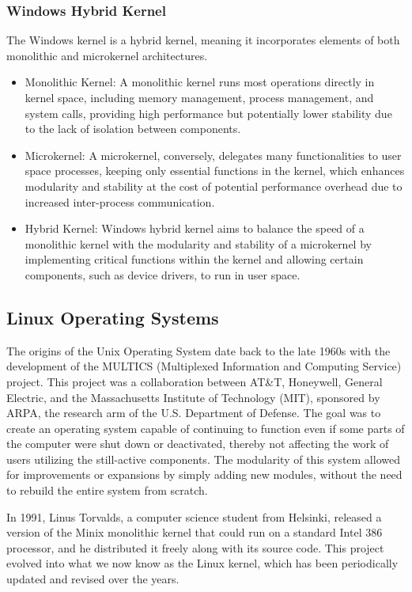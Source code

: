 \subsubsection{Windows Hybrid Kernel}
The Windows kernel is a hybrid kernel, meaning it incorporates elements of both monolithic and microkernel architectures.

\begin{itemize}
    \item Monolithic Kernel: A monolithic kernel runs most operations directly in kernel space, including memory management, process management, and system calls, providing high performance but potentially lower stability due to the lack of isolation between components.
    \item Microkernel: A microkernel, conversely, delegates many functionalities to user space processes, keeping only essential functions in the kernel, which enhances modularity and stability at the cost of potential performance overhead due to increased inter-process communication.
    \item Hybrid Kernel: Windows hybrid kernel aims to balance the speed of a monolithic kernel with the modularity and stability of a microkernel by implementing critical functions within the kernel and allowing certain components, such as device drivers, to run in user space.
\end{itemize}


\subsection{Linux Operating Systems}
The origins of the Unix Operating System date back to the late 1960s with the development of the MULTICS (Multiplexed Information and Computing Service) project. This project was a collaboration between AT\&T, Honeywell, General Electric, and the Massachusetts Institute of Technology (MIT), sponsored by ARPA, the research arm of the U.S. Department of Defense. The goal was to create an operating system capable of continuing to function even if some parts of the computer were shut down or deactivated, thereby not affecting the work of users utilizing the still-active components. The modularity of this system allowed for improvements or expansions by simply adding new modules, without the need to rebuild the entire system from scratch.

In 1991, Linus Torvalds, a computer science student from Helsinki, released a version of the Minix monolithic kernel that could run on a standard Intel 386 processor, and he distributed it freely along with its source code. This project evolved into what we now know as the Linux kernel, which has been periodically updated and revised over the years.

